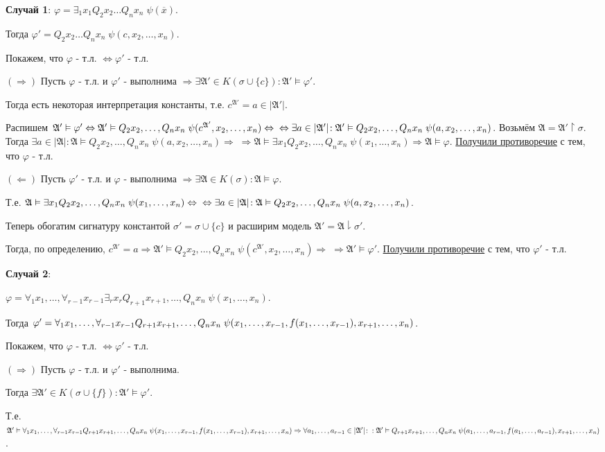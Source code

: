 \documentclass[18pt, a4paper]{extarticle}
\newcommand{\mA}{\mathfrak{A}}
\newcommand{\rightdok}{\boxed{(\Rightarrow)}}
\newcommand{\leftdok}{\boxed{(\Leftarrow)}}
\newcommand{\ovl}[1]{\overline{#1}}
\newcommand{\vp}{\varphi}
\newcommand{\vD}{\vDash}
\newcommand{\sg}{\sigma}
\newcommand{\lot}[3]{#1_#2,\dots,#1_#3}
\newcommand{\lotk}[4]{#1_#3 #2_#3,\dots,#1_#4 #2_#4}
\newcommand{\mr}{{r-1}}
\newcommand{\pr}{{r+1}}
\begin{document}
\qquad \textbf{Случай 1}: $\vp=\exists_1 x_1 Q_2 x_2\dots Q_n x_n\;\psi(\ovl x)$. 

Тогда $\vp'=Q_2 x_2\dots Q_n x_n\;\psi(c,\lot x 2 n)$.

Покажем, что $\vp$ - т.л. $\Leftrightarrow\vp'$ - т.л.

$\rightdok$ Пусть $\vp$ - т.л. и $\vp'$ - выполнима $\Rightarrow\exists\mA'\in K(\sg\cup\{c\})\!:\mA'\vD\vp'$.

Тогда есть некоторая интерпретация константы, т.е. $c^{\mA'}=a\in|\mA'|$.

Распишем $\mA'\vD\vp'\Leftrightarrow\mA'\vD\lotk Q x 2 n\;\psi(c^{\mA'},\lot x 2 n)\Leftrightarrow\newline\Leftrightarrow\exists a\in|\mA'|\!:\mA'\vD\lotk Q x 2 n\;\psi(a,\lot x 2 n)$.
\newline Возьмём $\mA=\mA'\upharpoonright\sg$. Тогда $\exists a\in|\mA|\!:\mA\vD\lotk Q x 2 n\;\psi(a,\lot x 2 n)\Rightarrow\;\Rightarrow\mA\vD\exists x_1\lotk Q x 2 n\;\psi(\lot x 1 n)\Rightarrow\mA\vD\vp$. \underline{Получили противоречие} с тем, что $\vp$ - т.л.

$\leftdok$ Пусть $\vp'$ - т.л. и $\vp$ - выполнима $\Rightarrow\exists\mA\in K(\sg)\!:\mA\vD\vp$.

Т.е. $\mA\vD\exists x_1\lotk Q x 2 n\;\psi(\lot x 1 n)\Leftrightarrow\newline\Leftrightarrow\exists a\in|\mA|\!:\mA\vD\lotk Q x 2 n\;\psi(a,\lot x 2 n)$.

Теперь обогатим сигнатуру константой $\sg'=\sg\cup\{c\}$ и расширим модель $\mA'=\mA\downharpoonright\sg'$. 

Тогда, по определению, $c^{\mA'}=a\Rightarrow\mA'\vD\lotk Q x 2 n\;\psi(c^{\mA'},\lot x 2 n)\Rightarrow\;\Rightarrow\mA'\vD\vp'$. \underline{Получили противоречие} с тем, что $\vp'$ - т.л.

\qquad \textbf{Случай 2}: 

$\vp=\lotk \forall x 1 \mr \exists_r x_r\lotk Q x \pr n\;\psi(\lot x 1 n)$.

Тогда $\vp'=\lotk \forall x 1 \mr \lotk Q x \pr n\;\psi(\lot x 1 \mr,\newline f(\lot x 1 \mr),\lot x \pr n)$.

Покажем, что $\vp$ - т.л. $\Leftrightarrow\vp'$ - т.л.

$\rightdok$ Пусть $\vp$ - т.л. и $\vp'$ - выполнима.

Тогда $\exists\mA'\in K(\sg\cup\{f\})\!:\mA'\vD\vp'$.

Т.е. $\mA'\vD\lotk \forall x 1 \mr \lotk Q x \pr n\;\psi(\lot x 1 \mr,\newline f(\lot x 1 \mr),\lot x \pr n)\Rightarrow\forall\lot a 1 \mr\in|\mA'|\!:\newline: \mA'\vD\lotk Q x \pr n\;\psi(\lot a 1 \mr, f(\lot a 1 \mr),\lot x \pr n)$.
\end{document}
